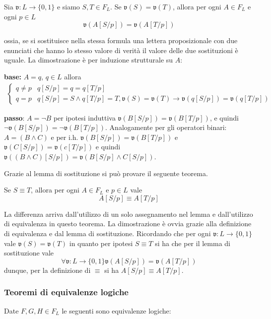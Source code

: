 \begin{lem}[di sostituzione]
Sia $\mathfrak{v}: L \rightarrow \{0,1\}$ e siamo $S,T \in F_L$. 
Se $\mathfrak{v}(S) = \mathfrak{v}(T)$,  allora per ogni $A \in F_L$ e ogni $p \in L$
$$
\mathfrak{v}(A[S/p]) = \mathfrak{v}(A[T/p])
$$ 
\end{lem}
ossia, se si sostituisce nella stessa formula una lettera proposizionale 
con due enunciati che hanno lo stesso valore di verità il valore delle due 
sostituzioni è uguale. La dimostrazione è per induzione strutturale su $A$: 
\newline 

\textbf{base:} $ A = q$, $q \in L$ allora 
\begin{align*}
  \begin{cases}
    q \neq p & q[S/p] = q = q[T/p] \\
    q = p & q[S/p] = S \land q [T/p] = T, \mathfrak{v}(S) = \mathfrak{v}(T) \rightarrow \mathfrak{v}(q[S/p]) = \mathfrak{v}(q[T/p])
  \end{cases}
\end{align*}
\newline 

\textbf{passo}: $A= \neg B$ per ipotesi induttiva $\mathfrak{v}(B[S/p]) = \mathfrak{v}(B[T/p])$, 
e quindi $\neg \mathfrak{v}(B[S/p]) = \neg \mathfrak{v}(B[T/p])$. Analogamente per gli 
operatori binari: 
$A = (B \land C)$ e per i.h. $\mathfrak{v}(B[S/p]) = \mathfrak{v}(B[T/p])$ e $\mathfrak{v}(C[S/p]) = \mathfrak{v}(c[T/p])$ 
e quindi $\mathfrak{v}((B\land C)[S/p]) = \mathfrak{v}(B[S/p] \land C[S/p])$. 

Grazie al lemma di sostituzione si può provare il seguente teorema. 
\begin{teo}[di sostituzione]
Se $S \equiv T$, allora per ogni $A \in F_L$ e $p \in L$ vale 
$$ 
A[S/p] \equiv A[T/p]
$$ 
\end{teo}
La differenza arriva dall'utilizzo di un solo assegnamento nel lemma e 
dall'utilizzo di equivalenza in questo teorema. 
La dimostrazione è ovvia grazie alla definizione di equivalenza e dal 
lemma di sostituzione. Ricordando che per ogni $\mathfrak{v}: L \rightarrow \{0,1\}$ vale 
$\mathfrak{v}(S) = \mathfrak{v}(T)$ in quanto per ipotesi $S \equiv T$ si ha che 
per il lemma di sostituzione vale 
$$
\forall \mathfrak{v}: L \rightarrow \{0,1\} \mathfrak{v}(A[S/p]) = \mathfrak{v}(A[T/p])
$$ 
dunque, per la definizione di $\equiv$ si ha $A[S/p] \equiv A[T/p]$. 


\noindent 
\subsubsection{Teoremi di equivalenze logiche}
Date $F, G, H \in F_L$ le seguenti sono equivalenze logiche: 

